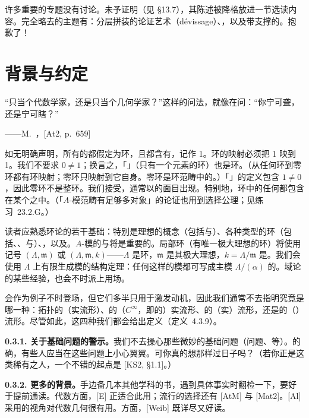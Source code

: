 许多重要的专题没有讨论。\trValuativeCriteria{}未予证明（见 \S13.7），其陈述被降格放进一节选读内容。完全略去的主题有：分层拼装的论证艺术（d\'evissage）、\trFormalScheme，以及带支撑的\trCohomology。抱歉了！

\section{背景与约定}

\epigraph
  {“只当个代数学家，还是只当个几何学家？”这样的问法，就像在问：“你宁可聋，还是宁可瞎？”}
  {——M.~\trAtiyah，[At2, p.~659]}

如无明确声明，所有的\trRing{}都假定为\trCommutative{}环，且都含有\trUnit，记作 1。环的映射必须把 1 映到 1。我们不要求 $0\neq 1$；换言之，「\trZeroRing{}」（只有一个元素的环）也是环。（从任何环到零环都有环映射；零环只映射到它自身。零环是环范畴中的\trFinalObject。）「\trIntegralDomain{}」的定义包含 $1\neq 0$，因此零环不是整环。我们接受\trAxiomOfChoice，通常以\trZornsLemma{}的面目出现。特别地，环中的任何\trProperIdeal{}都包含在某个\trMaximalIdeal{}之中。（「$A$-模范畴有足够多\trInjective{}对象」的论证也用到选择公理；见练习~23.2.G。）

读者应熟悉\trCommutative{}环论的若干基础：特别是理想的概念（包括\trPrimeIdeal{}与\trMaximalIdeal）、各种类型的环（包括\trIntegralDomain、\trPID、\trUFD{}与\trLocalRing）、\trLocalization，以及\trModule。$A$-模的\trTensorProduct{}与\trExactSequence{}将是重要的。局部环（有唯一极大理想的环）将使用记号 $(\Lambda,\mathfrak{m})$ 或 $(\Lambda,\mathfrak{m},k)$——$\Lambda$ 是环，$\mathfrak{m}$ 是其极大理想，$k=\Lambda/\mathfrak{m}$ 是\trResidueField。我们会使用\trPID{} $\Lambda$ 上有限生成模的结构定理：任何这样的模都可写成主模 $\Lambda/(\alpha)$ 的\trDirectSum。域论的某些经验，也会不时派上用场。

\trManifold{}会作为例子不时登场，但它们多半只用于激发动机，因此我们通常不去指明究竟是哪一种：拓扑的（实流形）、\trDifferentiable{}的（$C^\infty$，即\trSmooth{}的）实流形、\trAnalytic{}的（实）流形，还是\trComplex{}的（\trHolomorphic{}）流形。尽管如此，这四种我们都会给出定义（定义~4.3.9）。

\noindent\textbf{0.3.1. 关于基础问题的警示。}\quad 我们不去操心那些微妙的基础问题（\trSetTheoretic{}问题、\trUniverse{}等）。的确，有些人应当在这些问题上小心翼翼。可你真的想那样过日子吗？（若你正是这类稀有之人，一个不错的起点是 [KS2, \S1.1]。）

\noindent\textbf{0.3.2. 更多的背景。}\quad 手边备几本其他学科的书，遇到具体事实时翻检一下，要好于提前通读。\trCommutative{}代数方面，[E] 正适合此用；流行的选择还有 [AtM] 与 [Mat2]。[Al] 采用的视角对代数几何很有用。\trHomologicalAlgebra{}方面，[Weib] 既详尽又好读。


